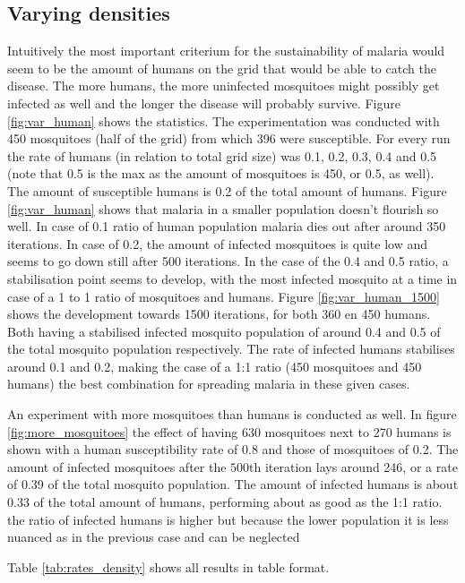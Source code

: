 \documentclass[a4paper]{report}
\begin{document}
\subsection{Varying densities} 
Intuitively the most important criterium for the sustainability of malaria would
seem to be the amount of humans on the grid that would be able to catch the
disease. The more humans, the more uninfected mosquitoes might possibly get
infected as well and the longer the disease will probably survive. Figure
\ref{fig:var_human} shows the statistics. The
experimentation was conducted with 450 mosquitoes (half of the grid) from which
396 were susceptible.  For every run the rate of humans (in relation to total
grid size) was 0.1, 0.2, 0.3, 0.4
and 0.5 (note that 0.5 is the max as the amount of mosquitoes is 450, or 0.5, as
well). The amount of susceptible humans is 0.2 of the total amount of humans.
Figure \ref{fig:var_human} shows that malaria in a smaller population doesn't
flourish so well. In case of 0.1 ratio of human population malaria dies out
after around 350 iterations. In case of 0.2, the amount of infected mosquitoes
is quite low and seems to go down still after 500 iterations.
 In the case of the 0.4 and 0.5 ratio, a stabilisation point seems to
develop, with the most infected mosquito at a time in case of a 1 to 1 ratio of
mosquitoes and humans. Figure \ref{fig:var_human_1500} shows the development towards 1500
iterations, for both 360 en 450 humans. Both having a stabilised infected
mosquito population of around 0.4 and 0.5 of the total mosquito population
respectively. The rate of infected humans stabilises around 0.1 and  0.2,
making the case of a 1:1 ratio (450 mosquitoes and 450 humans) the best
combination for spreading malaria in these given cases.

An experiment with more mosquitoes than humans is conducted as well. In figure
\ref{fig:more_mosquitoes}
the effect of having 630 mosquitoes next to 270 humans is shown with a human
susceptibility rate of 0.8 and those of mosquitoes of 0.2. The amount
of infected mosquitoes after the $500$th iteration lays around 246, or a rate
of 0.39 of the total mosquito population. The amount of infected humans
is about 0.33 of the total amount of humans, performing about as good as the
1:1 ratio. the ratio of infected humans is higher but because the lower
population it is less nuanced as in the previous case and can be neglected

Table \ref{tab:rates_density} shows all results in table format.
\end{document}
